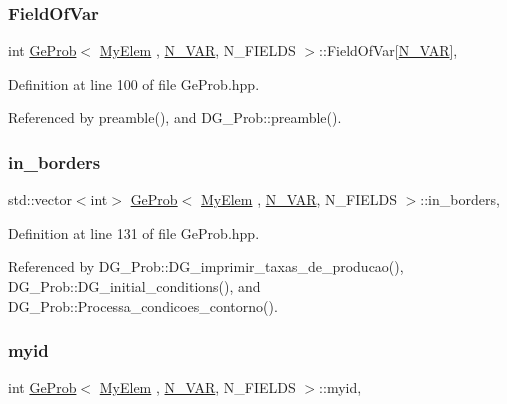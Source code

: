 \subsubsection{\texorpdfstring{Field\+Of\+Var}{FieldOfVar}}
{\footnotesize\ttfamily int \hyperlink{classGeProb}{Ge\+Prob}$<$ \hyperlink{DG__Prob_8h_a83cd887ced9a6587428f267e50cd4787}{My\+Elem} , \hyperlink{classED__Prob_a4e7d2ff1a8e435e336fb00c527224b5a}{N\+\_\+\+V\+AR}, N\+\_\+\+F\+I\+E\+L\+DS $>$\+::Field\+Of\+Var\mbox{[}\hyperlink{classED__Prob_a4e7d2ff1a8e435e336fb00c527224b5a}{N\+\_\+\+V\+AR}\mbox{]}\hspace{0.3cm}{\ttfamily [protected]}, {\ttfamily [inherited]}}



Definition at line 100 of file Ge\+Prob.\+hpp.



Referenced by preamble(), and D\+G\+\_\+\+Prob\+::preamble().

\mbox{\label{classGeProb_a9615df97c98b9b37d98f8548fad48439}} 
\subsubsection{\texorpdfstring{in\+\_\+borders}{in\_borders}}
{\footnotesize\ttfamily std\+::vector$<$int$>$ \hyperlink{classGeProb}{Ge\+Prob}$<$ \hyperlink{DG__Prob_8h_a83cd887ced9a6587428f267e50cd4787}{My\+Elem} , \hyperlink{classED__Prob_a4e7d2ff1a8e435e336fb00c527224b5a}{N\+\_\+\+V\+AR}, N\+\_\+\+F\+I\+E\+L\+DS $>$\+::in\+\_\+borders\hspace{0.3cm}{\ttfamily [protected]}, {\ttfamily [inherited]}}



Definition at line 131 of file Ge\+Prob.\+hpp.



Referenced by D\+G\+\_\+\+Prob\+::\+D\+G\+\_\+imprimir\+\_\+taxas\+\_\+de\+\_\+producao(), D\+G\+\_\+\+Prob\+::\+D\+G\+\_\+initial\+\_\+conditions(), and D\+G\+\_\+\+Prob\+::\+Processa\+\_\+condicoes\+\_\+contorno().

\mbox{\label{classGeProb_a45014741c0457991fb88b1dc1d2d31bc}} 
\subsubsection{\texorpdfstring{myid}{myid}}
{\footnotesize\ttfamily int \hyperlink{classGeProb}{Ge\+Prob}$<$ \hyperlink{DG__Prob_8h_a83cd887ced9a6587428f267e50cd4787}{My\+Elem} , \hyperlink{classED__Prob_a4e7d2ff1a8e435e336fb00c527224b5a}{N\+\_\+\+V\+AR}, N\+\_\+\+F\+I\+E\+L\+DS $>$\+::myid\hspace{0.3cm}{\ttfamily [protected]}, {\ttfamily [inherited]}}



